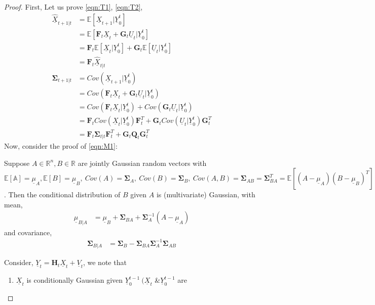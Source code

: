 \documentclass[a4paper,english,12pt]{article}
\begin{document}
\begin{proof}
First, Let us prove \eqref{eqn:T1}, \eqref{eqn:T2},
\begin{align*}
  \underline{\hat{X}}_{t+1|t}&=\mathbb{E}[\underline{X}_{t+1}|\underline{Y}_0^t]\\
  &=\mathbb{E}[\textbf{F}_t\underline{X}_t+ \textbf{G}_t\underline{U}_t|\underline{Y}_0^t]\\
  &=\textbf{F}_t\mathbb{E}[\underline{X}_t|\underline{Y}_0^t]+\textbf{G}_t\mathbb{E}[\underline{U}_t|\underline{Y}_0^t]\\
  &=\textbf{F}_t\underline{\hat{X}}_{t|t}\\
 \mathbf{\Sigma}_{t+1|t}&=Cov(\underline{X}_{t+1}|\underline{Y}_0^t)\\
 &=Cov(\textbf{F}_t\underline{X}_t+\textbf{G}_t\underline{U}_t|\underline{Y}_0^t)\\
 &=Cov(\textbf{F}_t\underline{X}_t|\underline{Y}_0^t)+Cov(\textbf{G}_t\underline{U}_t|\underline{Y}_0^t)\\
 &=\textbf{F}_tCov(\underline{X}_t|\underline{Y}_0^t)\textbf{F}_t^T+\textbf{G}_tCov(\underline{U}_t|\underline{Y}_0^t)\textbf{G}_t^T\\
 &=\textbf{F}_t\mathbf{\Sigma}_{t|t}\textbf{F}_t^T+\textbf{G}_t\textbf{Q}_t\textbf{G}_t^T
 \end{align*}
 Now, consider the proof of \eqref{eqn:M1}:
  \begin{lem}\label{lem:lem1}
  Suppose $A \in \mathbb{R}^n, B \in\mathbb{R}$ are jointly Gaussian random vectors with $\mathbb{E[A]=\underline{\mu}}_A,
  \mathbb{E}[B]=\underline{\mu}_B,~
  Cov(A)=\mathbf{\Sigma}_A,~Cov(B)=\mathbf{\Sigma}_B,~
  Cov(A,B)=\mathbf{\Sigma}_{AB}=\mathbf{\Sigma}_{BA}^T=\mathbb{E}[(A-\underline{\mu}_A)(B-\underline{\mu}_B)^T]$.
  Then the conditional distribution of $B$ given $A$ is (multivariate) Gaussian, with mean,
  \begin{align*}
  \underline{\mu}_{B|A}&=\underline{\mu}_B+\mathbf{\Sigma}_{BA}+\mathbf{\Sigma}_A^{-1}(A-\underline{\mu}_A)
  \end{align*}
  and covariance,
  \begin{align*}
  \mathbf{\Sigma}_{B|A}&=\mathbf{\Sigma}_B-\mathbf{\Sigma}_{BA}\mathbf{\Sigma}_A^{-1}\mathbf{\Sigma}_{AB}
  \end{align*}
  \end{lem}
 Consider, $\underline{Y}_t=\textbf{H}_t\underline{X}_t+\underline{V}_t$, we note that
 \begin{enumerate}
  \item $ \underline{X}_t$ is conditionally Gaussian given $\underline{Y}_0^{t-1}\ (\underline{X}_t$ \&$\underline{Y}_0^{t-1}$ are 

\end{enumerate}
\end{proof}
\end{document}
